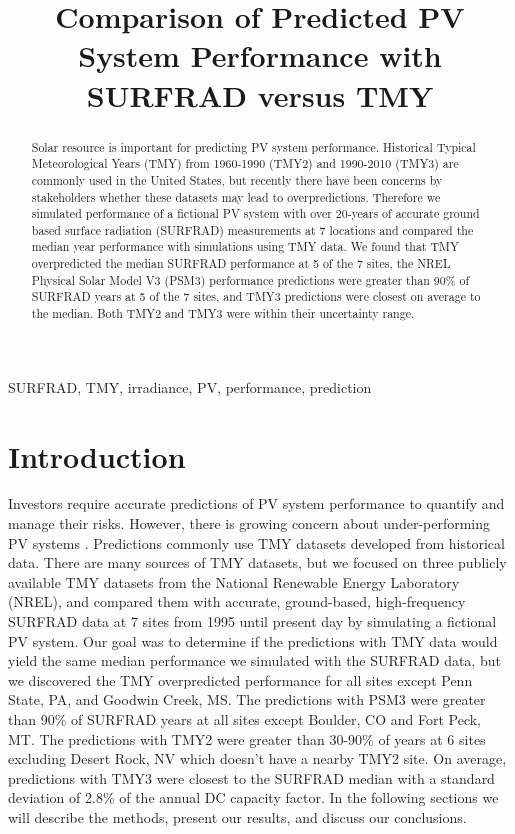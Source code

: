 \documentclass[conference]{IEEEtran}
\begin{document}
\title{Comparison of Predicted PV System Performance with SURFRAD versus TMY}

\author{
}

\maketitle

\begin{abstract}
Solar resource is important for predicting PV system performance. Historical Typical Meteorological Years (TMY) from 1960-1990 (TMY2) and 1990-2010 (TMY3) are commonly used in the United States, but recently there have been concerns by stakeholders whether these datasets may lead to overpredictions. Therefore we simulated performance of a fictional PV system with over 20-years of accurate ground based surface radiation (SURFRAD) measurements at 7 locations and compared the median year performance with simulations using TMY data. We found that TMY overpredicted the median SURFRAD performance at 5 of the 7 sites, the NREL Physical Solar Model V3 (PSM3) performance predictions were greater than 90\% of SURFRAD years at 5 of the 7 sites, and TMY3 predictions were closest on average to the median. Both TMY2 and TMY3 were within their uncertainty range.
\end{abstract}

\begin{IEEEkeywords}
SURFRAD, TMY, irradiance, PV, performance, prediction
\end{IEEEkeywords}

\section{Introduction}
Investors require accurate predictions of PV system performance to quantify and manage their risks. However, there is growing concern about under-performing PV systems \cite{Matsui2020}. Predictions commonly use TMY datasets developed from historical data. There are many sources of TMY datasets, but we focused on three publicly available TMY datasets from the National Renewable Energy Laboratory (NREL), and compared them with accurate, ground-based, high-frequency SURFRAD data at 7 sites from 1995 until present day \cite{Augustine2000} by simulating a fictional PV system. Our goal was to determine if the predictions with TMY data would yield the same median performance we simulated with the SURFRAD data, but we discovered the TMY overpredicted performance for all sites except Penn State, PA, and Goodwin Creek, MS. The predictions with PSM3 were greater than 90\% of SURFRAD years at all sites except Boulder, CO and Fort Peck, MT. The predictions with TMY2 were greater than 30-90\% of years at 6 sites excluding Desert Rock, NV which doesn't have a nearby TMY2 site. On average, predictions with TMY3 were closest to the SURFRAD median with a standard deviation of 2.8\% of the annual DC capacity factor. In the following sections we will describe the methods, present our results, and discuss our conclusions.
\end{document}
